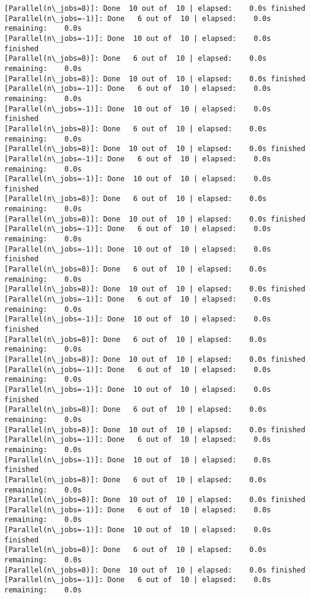 \documentclass[11pt]{article}
\begin{document}
\begin{Verbatim}[commandchars=\\\{\}]
[Parallel(n\_jobs=8)]: Done  10 out of  10 | elapsed:    0.0s finished
[Parallel(n\_jobs=-1)]: Done   6 out of  10 | elapsed:    0.0s remaining:    0.0s
[Parallel(n\_jobs=-1)]: Done  10 out of  10 | elapsed:    0.0s finished
[Parallel(n\_jobs=8)]: Done   6 out of  10 | elapsed:    0.0s remaining:    0.0s
[Parallel(n\_jobs=8)]: Done  10 out of  10 | elapsed:    0.0s finished
[Parallel(n\_jobs=-1)]: Done   6 out of  10 | elapsed:    0.0s remaining:    0.0s
[Parallel(n\_jobs=-1)]: Done  10 out of  10 | elapsed:    0.0s finished
[Parallel(n\_jobs=8)]: Done   6 out of  10 | elapsed:    0.0s remaining:    0.0s
[Parallel(n\_jobs=8)]: Done  10 out of  10 | elapsed:    0.0s finished
[Parallel(n\_jobs=-1)]: Done   6 out of  10 | elapsed:    0.0s remaining:    0.0s
[Parallel(n\_jobs=-1)]: Done  10 out of  10 | elapsed:    0.0s finished
[Parallel(n\_jobs=8)]: Done   6 out of  10 | elapsed:    0.0s remaining:    0.0s
[Parallel(n\_jobs=8)]: Done  10 out of  10 | elapsed:    0.0s finished
[Parallel(n\_jobs=-1)]: Done   6 out of  10 | elapsed:    0.0s remaining:    0.0s
[Parallel(n\_jobs=-1)]: Done  10 out of  10 | elapsed:    0.0s finished
[Parallel(n\_jobs=8)]: Done   6 out of  10 | elapsed:    0.0s remaining:    0.0s
[Parallel(n\_jobs=8)]: Done  10 out of  10 | elapsed:    0.0s finished
[Parallel(n\_jobs=-1)]: Done   6 out of  10 | elapsed:    0.0s remaining:    0.0s
[Parallel(n\_jobs=-1)]: Done  10 out of  10 | elapsed:    0.0s finished
[Parallel(n\_jobs=8)]: Done   6 out of  10 | elapsed:    0.0s remaining:    0.0s
[Parallel(n\_jobs=8)]: Done  10 out of  10 | elapsed:    0.0s finished
[Parallel(n\_jobs=-1)]: Done   6 out of  10 | elapsed:    0.0s remaining:    0.0s
[Parallel(n\_jobs=-1)]: Done  10 out of  10 | elapsed:    0.0s finished
[Parallel(n\_jobs=8)]: Done   6 out of  10 | elapsed:    0.0s remaining:    0.0s
[Parallel(n\_jobs=8)]: Done  10 out of  10 | elapsed:    0.0s finished
[Parallel(n\_jobs=-1)]: Done   6 out of  10 | elapsed:    0.0s remaining:    0.0s
[Parallel(n\_jobs=-1)]: Done  10 out of  10 | elapsed:    0.0s finished
[Parallel(n\_jobs=8)]: Done   6 out of  10 | elapsed:    0.0s remaining:    0.0s
[Parallel(n\_jobs=8)]: Done  10 out of  10 | elapsed:    0.0s finished
[Parallel(n\_jobs=-1)]: Done   6 out of  10 | elapsed:    0.0s remaining:    0.0s
[Parallel(n\_jobs=-1)]: Done  10 out of  10 | elapsed:    0.0s finished
[Parallel(n\_jobs=8)]: Done   6 out of  10 | elapsed:    0.0s remaining:    0.0s
[Parallel(n\_jobs=8)]: Done  10 out of  10 | elapsed:    0.0s finished
[Parallel(n\_jobs=-1)]: Done   6 out of  10 | elapsed:    0.0s remaining:    0.0s

\end{Verbatim}
\end{document}
